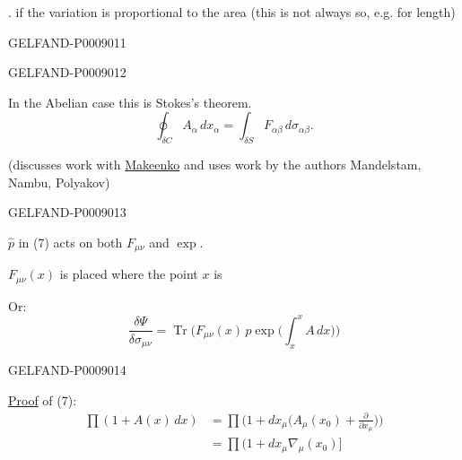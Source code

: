 . if the variation is proportional to the area
(this is not always so, e.g. for length)


\begin{GelfandAdjacentEvidence}{GELFAND-P000901}{1}
\end{GelfandAdjacentEvidence}
\begin{GelfandAdjacentEvidence}{GELFAND-P000901}{2}


In the Abelian case this is Stokes’s theorem.
\begin{equation*}
\oint_{\delta C} A_\alpha\,dx_\alpha
=\int_{\delta S} F_{\alpha\beta}\,d\sigma_{\alpha\beta}.
\tag{9}
\end{equation*}

(discusses work with \underline{Makeenko} and uses work by the authors Mandelstam, Nambu, Polyakov)
\end{GelfandAdjacentEvidence}
\begin{GelfandAdjacentEvidence}{GELFAND-P000901}{3}


$\hat p$ in (7) acts on both $F_{\mu\nu}$ and $\exp$.

$F_{\mu\nu}(x)$ is placed where the point $x$ is

Or:
\begin{equation*}
\frac{\delta\Psi}{\delta\sigma_{\mu\nu}}
=\operatorname{Tr}\biggl(F_{\mu\nu}(x)\,p\exp\biggl(\int_x^x A\,dx\biggr)\biggr)
\tag{10}
\end{equation*}
\end{GelfandAdjacentEvidence}
\begin{GelfandAdjacentEvidence}{GELFAND-P000901}{4}


\underline{Proof} of (7):
\begin{equation*}
\begin{aligned}
\prod(1+A(x)\,dx)
&=\prod\biggl(1+dx_\mu\biggl(A_\mu(x_0)+\frac{\partial}{\partial x_\mu}\biggr)\biggr)\\
&=\prod\bigl(1+dx_\mu\nabla_\mu(x_0)\bigr]
\end{aligned}
\tag{11}
\end{equation*}
\end{GelfandAdjacentEvidence}
